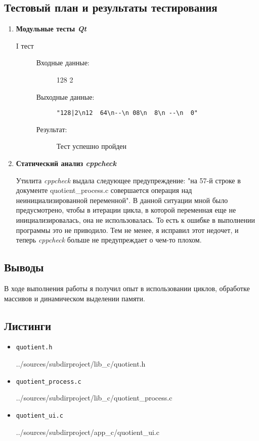 \documentclass[12pt,a4paper]{report}
\begin{document}
\subsection{Тестовый план и результаты тестирования}
\hspace{\parindent}
\begin{enumerate}
\item \textbf{Модульные тесты \textit{Qt}}

\begin{description}
\item[I тест]
\hspace{\parindent}
\begin{flushleft}
\begin{description}
\item[Входные данные:] 128 2
\item[Выходные данные:] \verb/"128|2\n12  64\n--\n 08\n  8\n --\n  0"/
\item[Результат:] Тест успешно пройден
\end{description}
\end{flushleft}
\end{description}

\item \textbf{Статический анализ \textit{cppcheck}}

Утилита \textit{cppcheck} выдала следующее предупреждение: "на 57-й строке в документе quotient\_process.c совершается операция над неинициализированной переменной".
В данной ситуации мной было предусмотрено, чтобы в итерации цикла, в которой переменная еще не инициализировалась, она не использовалась. То есть к ошибке в выполнении программы это не приводило. Тем не менее, я исправил этот недочет, и теперь \textit{cppcheck} больше не предупреждает о чем-то плохом.
\end{enumerate}
\subsection{Выводы}
\hspace{\parindent}
В ходе выполнения работы я получил опыт в использовании циклов, обработке массивов и динамическом выделении памяти.
\subsection*{Листинги}
\begin{itemize}
\item[] \verb-quotient.h-

{../sources/subdirproject/lib_c/quotient.h}
\item[] \verb-quotient_process.c-

{../sources/subdirproject/lib_c/quotient_process.c}
\item[] \verb-quotient_ui.c-

{../sources/subdirproject/app_c/quotient_ui.c}
\end{itemize}
\end{document}

